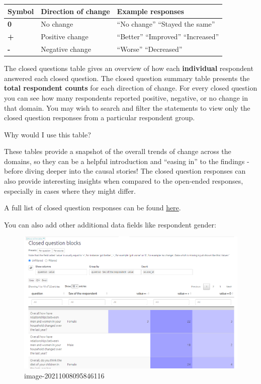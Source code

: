 \documentclass[
]{book}
\begin{document}
\begin{longtable}[]{@{}lll@{}}
\toprule
\textbf{Symbol} & \textbf{Direction of change} & \textbf{Example responses} \\
\midrule
\endhead
\textbf{0} & No change & ``No change'' ``Stayed the same'' \\
\textbf{+} & Positive change & ``Better'' ``Improved'' ``Increased'' \\
\textbf{-} & Negative change & ``Worse'' ``Decreased'' \\
\bottomrule
\end{longtable}

The closed questions table gives an overview of how each \textbf{individual} respondent answered each closed question. The closed question summary table presents the \textbf{total respondent counts} for each direction of change. For every closed question you can see how many respondents reported positive, negative, or no change in that domain. You may wish to search and filter the statements to view only the closed question responses from a particular respondent group.

Why would I use this table?

These tables provide a snapshot of the overall trends of change across the domains, so they can be a helpful introduction and ``easing in'' to the findings - before diving deeper into the causal stories! The closed question responses can also provide interesting insights when compared to the open-ended responses, especially in cases where they might differ.

A full list of closed question responses can be found \href{https://guide.causalmap.app/importing-your-data-special-cases.html?q=recodes\#quip-recodes-for-closed-questions---live-link}{here}.

You can also add other additional data fields like respondent gender:

\begin{figure}
\centering
\includegraphics[width=6.77083in,height=\textheight]{_assets/image-20211008095846116.png}
\caption{image-20211008095846116}
\end{figure}
\end{document}
